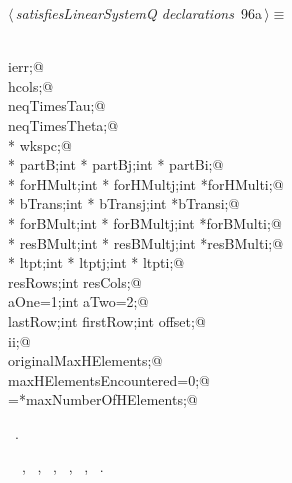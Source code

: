\documentclass{article}
\begin{document}
\begin{flushleft} \small
\begin{minipage}{\linewidth}\label{scrap178}\raggedright\small
{} $\langle\,${\itshape satisfiesLinearSystemQ declarations}\nobreak\ {\footnotesize {96a}}$\,\rangle\equiv$
\vspace{-1ex}
\begin{list}{}{} \item
\mbox{}\verb@@\\
\mbox{}\verb@int ierr;@\\
\mbox{}\verb@int hcols;@\\
\mbox{}\verb@int neqTimesTau;@\\
\mbox{}\verb@int neqTimesTheta;@\\
\mbox{}\verb@double * wkspc;@\\
\mbox{}\verb@double * partB;int * partBj;int * partBi;@\\
\mbox{}\verb@double * forHMult;int * forHMultj;int *forHMulti;@\\
\mbox{}\verb@double * bTrans;int * bTransj;int *bTransi;@\\
\mbox{}\verb@double * forBMult;int * forBMultj;int *forBMulti;@\\
\mbox{}\verb@double * resBMult;int * resBMultj;int *resBMulti;@\\
\mbox{}\verb@double * ltpt;int * ltptj;int * ltpti;@\\
\mbox{}\verb@int resRows;int resCols;@\\
\mbox{}\verb@int aOne=1;int aTwo=2;@\\
\mbox{}\verb@int lastRow;int firstRow;int offset;@\\
\mbox{}\verb@int ii;@\\
\mbox{}\verb@int originalMaxHElements;@\\
\mbox{}\verb@int maxHElementsEncountered=0;@\\
\mbox{}\verb@originalMaxHElements=*maxNumberOfHElements;@\\
\mbox{}\verb@@{\NWsep}
\end{list}
\vspace{-1.5ex}
\footnotesize
\begin{list}{}{\setlength{\itemsep}{-\parsep}\setlength{\itemindent}{-\leftmargin}}
\item \NWtxtMacroRefIn\ .
\item \NWtxtIdentsUsed\nobreak\  \verb@aOne@\nobreak\ , \verb@hcols@\nobreak\ , \verb@ierr@\nobreak\ , \verb@maxHElementsEncountered@\nobreak\ , \verb@maxNumberOfHElements@\nobreak\ , \verb@resRows@\nobreak\ .
\item{}
\end{list}
\end{minipage}\vspace{4ex}
\end{flushleft}
\end{document}
